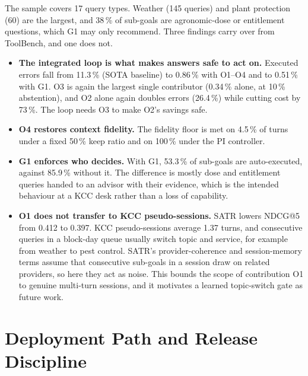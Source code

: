 The sample covers 17 query types. Weather (145 queries) and plant protection (60) are the largest, and 38\,\% of sub-goals are agronomic-dose or entitlement questions, which G1 may only recommend.
Three findings carry over from ToolBench, and one does not.
\begin{itemize}
  \item \textbf{The integrated loop is what makes answers safe to act on.} Executed errors fall from 11.3\,\% (SOTA baseline) to 0.86\,\% with O1--O4 and to 0.51\,\% with G1. O3 is again the largest single contributor (0.34\,\% alone, at 10\,\% abstention), and O2 alone again doubles errors (26.4\,\%) while cutting cost by 73\,\%. The loop needs O3 to make O2's savings safe.
  \item \textbf{O4 restores context fidelity.} The fidelity floor is met on 4.5\,\% of turns under a fixed 50\,\% keep ratio and on 100\,\% under the PI controller.
  \item \textbf{G1 enforces who decides.} With G1, 53.3\,\% of sub-goals are auto-executed, against 85.9\,\% without it. The difference is mostly dose and entitlement queries handed to an advisor with their evidence, which is the intended behaviour at a KCC desk rather than a loss of capability.
  \item \textbf{O1 does not transfer to KCC pseudo-sessions.} SATR lowers NDCG@5 from 0.412 to 0.397. KCC pseudo-sessions average 1.37 turns, and consecutive queries in a block-day queue usually switch topic and service, for example from weather to pest control. SATR's provider-coherence and session-memory terms assume that consecutive sub-goals in a session draw on related providers, so here they act as noise. This bounds the scope of contribution O1 to genuine multi-turn sessions, and it motivates a learned topic-switch gate as future work.
\end{itemize}



\section{Deployment Path and Release Discipline}
\label{sec:gov-release}

